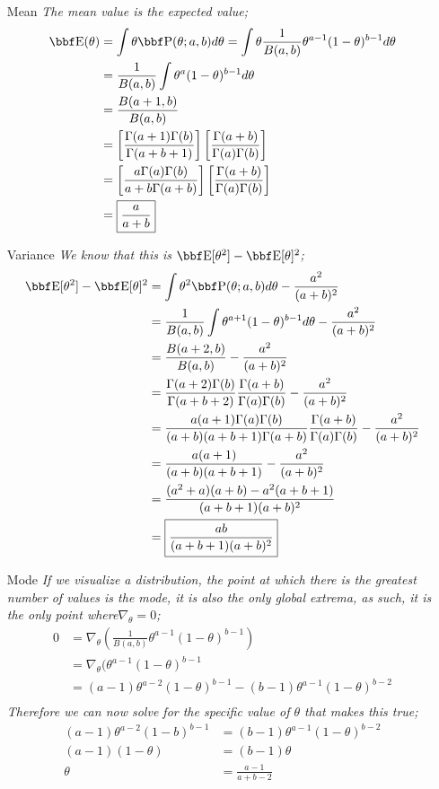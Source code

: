 \documentclass[12pt,letterpaper,fleqn]{hmcpset}
\begin{document}
\begin{solution}
\begin{enumerate}
\item[Mean] \textit{The mean value is the expected value; }
\begin{align*}
\EE(\theta) &= \int \theta \pro d\theta = \int \theta \frac{1}{B(a,b)} \theta^{a-1} (1-\theta)^{b-1} d\theta\\
&= \frac{1}{B(a,b)} \int \theta^{a}(1-\theta)^{b-1} d\theta \\
&= \frac{B(a+1,b)}{B(a,b)}\\
&= \left[\frac{\Gamma(a+1)\Gamma(b)}{\Gamma(a+b+1)}\right] \left[\frac{\Gamma(a+b)}{\Gamma(a)\Gamma(b)}\right]\\
&=\left[\frac{a\Gamma(a)\Gamma(b)}{a+b\Gamma(a+b)}\right] \left[\frac{\Gamma(a+b)}{\Gamma(a)\Gamma(b)}\right]\\
&=\boxed{\frac{a}{a+b}}
\end{align*}
\item[Variance] \textit{We know that this is $\EE[\theta^2]-\EE[\theta]^2$;}
\begin{align*}
\EE[\theta^2]-\EE[\theta]^2&= \int \theta^2 \pro d\theta - \frac{a^2}{(a+b)^2}\\
&=\frac{1}{B(a,b)}\int \theta^{a+1}(1-\theta)^{b-1}d \theta  - \frac{a^2}{(a+b)^2}\\
&= \frac{B(a+2,b)}{B(a,b)} - \frac{a^2}{(a+b)^2}\\
&= \frac{\Gamma(a+2)\Gamma(b)}{\Gamma(a+b+2)}\frac{\Gamma(a+b)}{\Gamma(a)\Gamma(b)}- \frac{a^2}{(a+b)^2}\\
&= \frac{a(a+1)\Gamma(a)\Gamma(b)}{(a+b)(a+b+1)\Gamma(a+b)}\frac{\Gamma(a+b)}{\Gamma(a)\Gamma(b)}- \frac{a^2}{(a+b)^2}\\
&=\frac{a(a+1)}{(a+b)(a+b+1)}- \frac{a^2}{(a+b)^2}\\
&=\frac{(a^2+a)(a+b)-a^2(a+b+1)}{(a+b+1)(a+b)^2}\\
&=\boxed{\frac{ab}{(a+b+1)(a+b)^2}}
\end{align*}
\item[Mode] \textit{If we visualize a distribution, the point at which there is the greatest number of values is the mode, it is also the only global extrema, as such, it is the only point where$\nabla_{\theta} = 0$;}
\begin{align*}
0 &= \nabla_{\theta}\left(\frac{1}{B(a,b)}\theta^{a-1}(1-\theta)^{b-1}\right)\\
 &=\nabla_{\theta}(\theta^{a-1}(1-\theta)^{b-1}\\
 &=(a-1)\theta^{a-2}(1-\theta)^{b-1}-(b-1)\theta^{a-1}(1-\theta)^{b-2}\\
\end{align*}
\textit{Therefore we can now solve for the specific value of $\theta$ that makes this true; }
\begin{align*}
(a-1)\theta^{a-2}(1-b)^{b-1} &= (b-1)\theta^{a-1}(1-\theta)^{b-2}\\
(a-1)(1-\theta)&=(b-1)\theta\\
\theta &=\boxed{ \frac{a-1}{a+b-2}}
\end{align*}
\end{enumerate}
\end{solution}
\newpage
\end{document}
